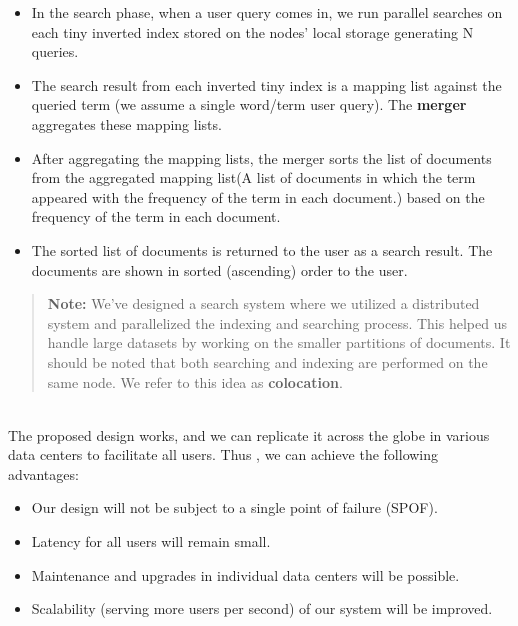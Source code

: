 \begin{itemize}
\item
\protect{}\label{GCfQy3Pe0JgtF9zQFMIwp}
In the search phase, when a user query comes in, we run parallel searches on each tiny inverted index stored on the nodes' local storage generating N queries.
\item
\protect{}\label{U4aLuWpN4V5kSshQgGgPR}
The search result from each inverted tiny index is a mapping list against the queried term (we assume a single word/term user query). The \textbf{merger} aggregates these mapping lists.
\item
\protect{}\label{nrEH41oHTZQLwlY-SqBA2}
After aggregating the mapping lists, the merger sorts the list of documents from the aggregated mapping list(A list of documents in which the term appeared with the frequency of the term in each document.) based on the frequency of the term in each document.
\item
\protect{}\label{2RJ-8yfQTSA3RT83KwYnw}
The sorted list of documents is returned to the user as a search result. The documents are shown in sorted (ascending) order to the user.
\end{itemize}
\begin{quote}
\textbf{Note:} We've designed a search system where we utilized a distributed system and parallelized the indexing and searching process. This helped us handle large datasets by working on the smaller partitions of documents. It should be noted that both searching and indexing are performed on the same node. We refer to this idea as \textbf{colocation}.
\end{quote}
\\
The proposed design works, and we can replicate it across the globe in various data centers to facilitate all users. Thus , we can achieve the following advantages:

\begin{itemize}
\item
\protect{}\label{kHsZCFcR_F3ET9lxydC77}
Our design will not be subject to a single point of failure (SPOF).
\item
\protect{}\label{sUbyze83catAhn--evin0}
Latency for all users will remain small.
\item
\protect{}\label{VSjBbmynEknSBy3FEQALM}
Maintenance and upgrades in individual data centers will be possible.
\item
\protect{}\label{F0mPDo0xVJ93NKdI1f5EY}
Scalability (serving more users per second) of our system will be improved.
\end{itemize}

